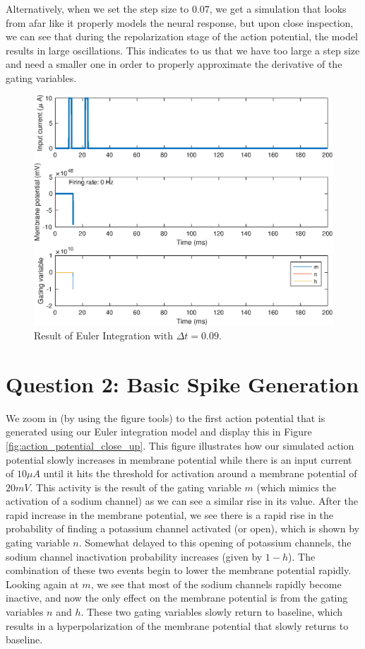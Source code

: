 \documentclass[11pt, oneside]{article}
\begin{document}
Alternatively, when we set the step size to $0.07$, we get a simulation that looks from afar like it properly models the neural response, but upon close inspection, we can see that during the repolarization stage of the action potential, the model results in large oscillations. This indicates to us that we have too large a step size and need a smaller one in order to properly approximate the derivative of the gating variables.

\begin{figure}[ht!]
\centering
\includegraphics[width=1\textwidth]{simulate_hh_dt_9.eps}
\caption{Result of Euler Integration with $\Delta t = 0.09$.}
\label{fig:euler_integration_nine}
\end{figure}

\section{Question 2: Basic Spike Generation}
We zoom in (by using the figure tools) to the first action potential that is generated using our Euler integration model and display this in Figure \ref{fig:action_potential_close_up}. This figure illustrates how our simulated action potential slowly increases in membrane potential while there is an input current of $10\mu A$ until it hits the threshold for activation around a membrane potential of $20mV$. This activity is the result of the gating variable $m$ (which mimics the activation of a sodium channel) as we can see a similar rise in its value. After the rapid increase in the membrane potential, we see there is a rapid rise in the probability of finding a potassium channel activated (or open), which is shown by gating variable $n$. Somewhat delayed to this opening of potassium channels, the sodium channel inactivation probability increases (given by $1-h$). The combination of these two events begin to lower the membrane potential rapidly. Looking again at $m$, we see that most of the sodium channels rapidly become inactive, and now the only effect on the membrane potential is from the gating variables $n$ and $h$. These two gating variables slowly return to baseline, which results in a hyperpolarization of the membrane potential that slowly returns to baseline.
\end{document}
